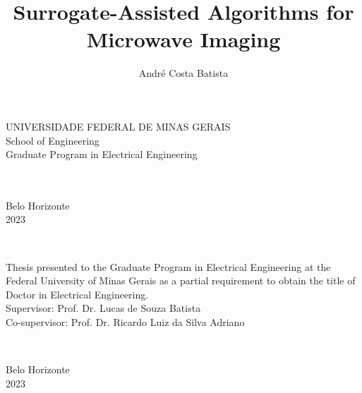 \documentclass[12pt,a4paper,oneside]{book}
\title{Surrogate-Assisted Algorithms for Microwave Imaging}
\author{André Costa Batista}
\begin{document}
    
    \begin{titlepage}

        \begin{center}
            \begin{spacing}{1}
                UNIVERSIDADE FEDERAL DE MINAS GERAIS \\
                School of Engineering \\
                Graduate Program in Electrical Engineering
            \end{spacing}
            \vspace{5cm}
            \theauthor \\
            \vspace{5cm}
            \textbf{\MakeUppercase\thetitle}\\
            \vspace*{\fill}
            Belo Horizonte\\2023
        \end{center}

	\end{titlepage}

	\newpage
	\thispagestyle{empty}
	\begin{center}
		\theauthor\\
		\vspace{5cm}
		\textbf{\thetitle}
	\end{center}
	\vspace{5cm}
	\hfill
	\begin{minipage}{8cm}
		Thesis presented to the Graduate Program in Electrical Engineering at the Federal University of Minas Gerais as a partial requirement to obtain the title of Doctor in Electrical Engineering.\\[3mm]
		Supervisor: Prof. Dr. Lucas de Souza Batista \\[3mm]
		Co-supervisor: Prof. Dr. Ricardo Luiz da Silva Adriano
	\end{minipage}\\
	\begin{center}
		\vspace*{\fill}
		Belo Horizonte\\2023
	\end{center}

    

    
\end{document}
